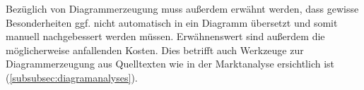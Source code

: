 Bezüglich von Diagrammerzeugung muss außerdem erwähnt werden, dass gewisse Besonderheiten ggf. nicht automatisch in ein Diagramm übersetzt und somit manuell nachgebessert werden müssen. Erwähnenswert sind außerdem die möglicherweise anfallenden Kosten. Dies betrifft auch Werkzeuge zur Diagrammerzeugung aus Quelltexten wie in der Marktanalyse ersichtlich ist (\autoref{subsubsec:diagramanalyses}). 